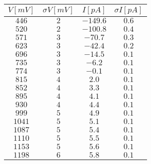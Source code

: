 \begin{tabular}{cccc}
\hline
	$V[mV]$ & $\sigma V[mV]$ & $I[pA]$ & $\sigma I[pA]$\\ 
\hline
	$446$ & $2$ & $-149.6$ & $0.6$ \\
	$520$ & $2$ & $-100.8$ & $0.4$ \\
	$571$ & $3$ & $-70.7$ & $0.3$ \\
	$623$ & $3$ & $-42.4$ & $0.2$ \\
	$696$ & $3$ & $-14.5$ & $0.1$ \\
	$735$ & $3$ & $-6.2$ & $0.1$ \\
	$774$ & $3$ & $-0.1$ & $0.1$ \\
	$815$ & $4$ & $2.0$ & $0.1$ \\
	$852$ & $4$ & $3.3$ & $0.1$ \\
	$895$ & $4$ & $4.1$ & $0.1$ \\
	$930$ & $4$ & $4.4$ & $0.1$ \\
	$999$ & $5$ & $4.9$ & $0.1$ \\
	$1041$ & $5$ & $5.1$ & $0.1$ \\
	$1087$ & $5$ & $5.4$ & $0.1$ \\
	$1110$ & $5$ & $5.5$ & $0.1$ \\
	$1153$ & $5$ & $5.6$ & $0.1$ \\
	$1198$ & $6$ & $5.8$ & $0.1$ \\
\hline
\end{tabular}
